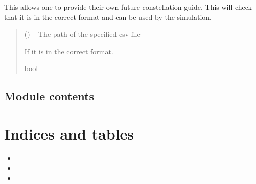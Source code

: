 \documentclass[letterpaper,10pt,english]{sphinxmanual}
\begin{document}
\begin{fulllineitems}
\label{\detokenize{fspsim:fspsim.simulate.set_future_constellations}}
\pysigstartsignatures
{}
\pysigstopsignatures
\sphinxAtStartPar
This allows one to provide their own future constellation guide. This will check that it is in the correct format
and can be used by the simulation.
\begin{quote}\begin{description}
\sphinxAtStartPar
{} () – The path of the specified csv file

\sphinxAtStartPar
If it is in the correct format.

\sphinxAtStartPar
bool

\end{description}\end{quote}

\end{fulllineitems}



\section{Module contents}
\label{\detokenize{fspsim:module-fspsim}}\label{\detokenize{fspsim:module-contents}}

\chapter{Indices and tables}
\label{\detokenize{index:indices-and-tables}}\begin{itemize}
\item {} 
\sphinxAtStartPar
{}

\item {} 
\sphinxAtStartPar
{}

\item {} 
\sphinxAtStartPar
{}

\end{itemize}
\end{document}
